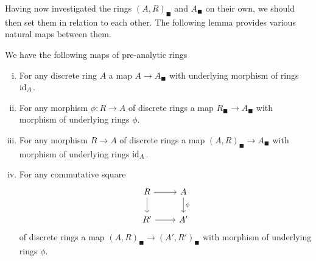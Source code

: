 Having now investigated the rings $(A, R)_\blacksquare$ and $A_\blacksquare$ on their own, we should then set them in relation to each other. The following lemma provides various natural maps between them.
\begin{lemma}
	\label{lemma: some maps of pre-analytic rings}
	
	We have the following maps of pre-analytic rings
	\begin{enumerate}[(i)]
		\item
		For any discrete ring $A$ a map $A\to A_\blacksquare$ with underlying morphism of rings $\mathrm{id}_A$.
		
		\item
		\label{lemma: some maps of pre-analytic rings, ii}
		For any morphism $\phi\colon R\to A$ of discrete rings a map $R_\blacksquare\to A_\blacksquare$ with morphism of underlying rings $\phi$.
		
		\item
		For any morphism $R\to A$ of discrete rings a map $(A, R)_\blacksquare\to A_\blacksquare$ with morphism of underlying rings $\mathrm{id}_A$.
		
		\item
		For any commutative square
		$$\begin{tikzcd}
			R\ar[r]\ar[d] &A\ar[d, "\phi"]\\
			R'\ar[r] & A'
		\end{tikzcd}$$
		of discrete rings a map $(A, R)_\blacksquare \to (A', R')_\blacksquare$ with morphism of underlying rings $\phi$.
	\end{enumerate}
\end{lemma}
